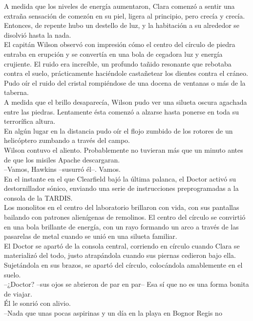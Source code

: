A medida que los niveles de energía aumentaron, Clara comenzó a sentir
una extraña sensación de comezón en su piel, ligera al principio, pero
crecía y crecía.\\
Entonces, de repente hubo un destello de luz, y la habitación a su
alrededor se disolvió hasta la nada.\\[2\baselineskip]El capitán Wilson
observó con impresión cómo el centro del círculo de piedra entraba en
erupción y se convertía en una bola de cegadora luz y energía crujiente.
El ruido era increíble, un profundo tañido resonante que rebotaba contra
el suelo, prácticamente haciéndole castañetear los dientes contra el
cráneo. Pudo oír el ruido del cristal rompiéndose de una docena de
ventanas o más de la taberna.\\
A medida que el brillo desaparecía, Wilson pudo ver una silueta oscura
agachada entre las piedras. Lentamente ésta comenzó a alzarse hasta
ponerse en toda su terrorífica altura.\\
En algún lugar en la distancia pudo oír el flojo zumbido de los rotores
de un helicóptero zumbando a través del campo.\\
Wilson contuvo el aliento. Probablemente no tuvieran más que un minuto
antes de que los misiles Apache descargaran.\\
--Vamos, Hawkins --susurró él--. Vamos.\\[2\baselineskip]En el instante
en el que Clearfield bajó la última palanca, el Doctor activó su
destornillador sónico, enviando una serie de instrucciones
preprogramadas a la consola de la TARDIS.\\
Los monolitos en el centro del laboratorio brillaron con vida, con sus
pantallas bailando con patrones alienígenas de remolinos. El centro del
círculo se convirtió en una bola brillante de energía, con un rayo
formando un arco a través de las pasarelas de metal cuando se unió en
una silueta familiar.\\
El Doctor se apartó de la consola central, corriendo en círculo cuando
Clara se materializó del todo, justo atrapándola cuando sus piernas
cedieron bajo ella.\\
Sujetándola en sus brazos, se apartó del círculo, colocándola
amablemente en el suelo.\\
--¿Doctor? --sus ojos se abrieron de par en par-- Esa sí que no es una
forma bonita de viajar.\\
Él le sonrió con alivio.\\
--Nada que unas pocas aspirinas y un día en la playa en Bognor Regis no
